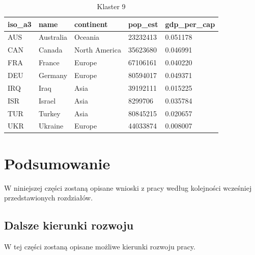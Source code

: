\documentclass[11pt]{report}
\begin{document}
    \begin{table}[]
        \caption {Klaster 9} \label{tab:cl9}
        \begin{tabular}{lllll}
            \hline
            \multicolumn{1}{|l|}{iso\_a3} & \multicolumn{1}{l|}{name} & \multicolumn{1}{l|}{continent} & \multicolumn{1}{l|}{pop\_est} & \multicolumn{1}{l|}{gdp\_per\_cap} \\ \hline
            AUS                           & Australia                 & Oceania                        & 23232413                      & 0.051178                           \\
            CAN                           & Canada                    & North America                  & 35623680                      & 0.046991                           \\
            FRA                           & France                    & Europe                         & 67106161                      & 0.040220                           \\
            DEU                           & Germany                   & Europe                         & 80594017                      & 0.049371                           \\
            IRQ                           & Iraq                      & Asia                           & 39192111                      & 0.015225                           \\
            ISR                           & Israel                    & Asia                           & 8299706                       & 0.035784                           \\
            TUR                           & Turkey                    & Asia                           & 80845215                      & 0.020657                           \\
            UKR                           & Ukraine                   & Europe                         & 44033874                      & 0.008007
        \end{tabular}
    \end{table}


    \chapter{Podsumowanie}
    W niniejszej części zostaną opisane wnioski z pracy według kolejności wcześniej przedstawionych rozdziałów.


    \section{Dalsze kierunki rozwoju}
    W tej części zostaną opisane możliwe kierunki rozwoju pracy.
\end{document}
